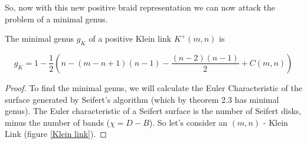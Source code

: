 \documentclass[12pt]{article}
\newenvironment{theorem}[2][Theorem]{\begin{trivlist}
\item[\hskip \labelsep {\bfseries #1}\hskip \labelsep {\bfseries #2.}]}{\end{trivlist}}
\begin{document}
So, now with this new positive braid representation we can now attack the problem of a minimal genus. 


\begin{theorem}{2.4}
The minimal genus $g_K$ of a positive Klein link $K^+(m, n)$ is 

\begin{equation}
g_K =  1 - \frac{1}{2}\left(n - (m - n + 1)(n-1) - \frac{(n-2)(n-1)}{2} + C(m, n)\right)
\end{equation}
\end{theorem}

\begin{proof}
To find the minimal genus, we will calculate the Euler Characteristic of the surface generated by Seifert's algorithm (which by theorem 2.3 has minimal genus). The Euler characteristic of a Seifert surface is the number of Seifert disks, minus the number of bands ($\chi = D - B$). So let's consider an $(m, n)$ - Klein Link (figure \ref{Klein link}).



\end{proof}
\end{document}
